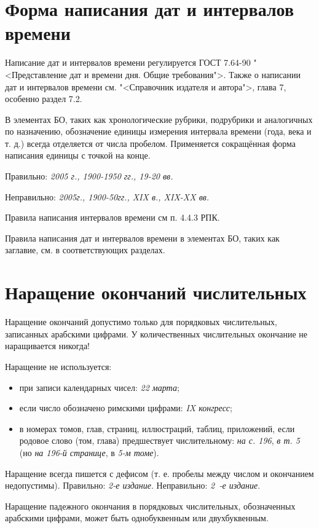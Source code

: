 \section{Форма написания дат и интервалов времени}

Написание дат и интервалов времени регулируется ГОСТ 7.64-90 "<Представление дат и времени дня. Общие требования">. Также о написании дат и интервалов времени см. "<Справочник издателя и автора">, глава 7, особенно раздел 7.2.

В элементах БО, таких как хронологические рубрики, подрубрики и аналогичных по назначению, обозначение единицы измерения интервала времени (года, века и т. д.) всегда отделяется от числа пробелом. Применяется сокращённая форма написания единицы с точкой на конце.

Правильно: \emph{2005 г., 1900-1950 гг., 19-20 вв.}

Неправильно: \emph{2005г., 1900-50гг., XIX в., XIX-XX вв.}

Правила написания интервалов времени см п. 4.4.3 РПК.

Правила написания дат и интервалов времени в элементах БО, таких как заглавие, см. в соответствующих разделах.

\section{Наращение окончаний числительных}

Наращение окончаний допустимо только для порядковых числительных, записанных арабскими цифрами. У количественных числительных окончание не наращивается никогда!

Наращение не используется:

\begin{itemize}
    \item при записи календарных чисел: \emph{22 марта};
    \item если число обозначено римскими цифрами: \emph{IX конгресс};
    \item в номерах томов, глав, страниц, иллюстраций, таблиц, приложений, если родовое слово (том, глава) предшествует числительному: \emph{на с. 196}, \emph{в т. 5} (но \emph{на 196-й странице}, в \emph{5-м томе}).
\end{itemize}

Наращение всегда пишется с дефисом (т. е. пробелы между числом и окончанием недопустимы). Правильно: \emph{2-е издание}. Неправильно: \emph{2~-е издание}.

Наращение падежного окончания в порядковых числительных, обозначенных арабскими цифрами, может быть однобуквенным или двухбуквенным.

